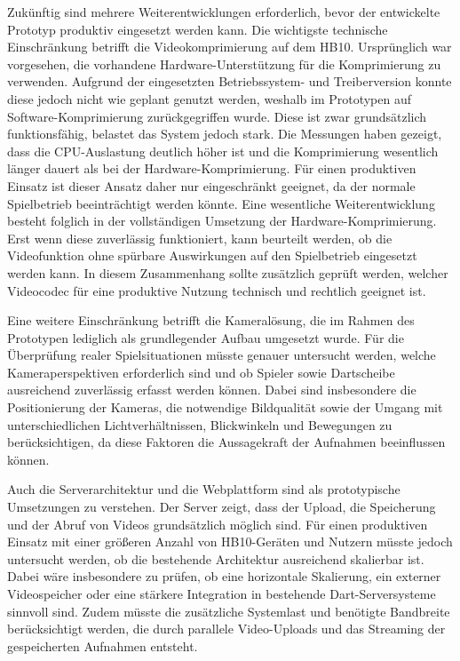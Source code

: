 Zukünftig sind mehrere Weiterentwicklungen erforderlich, bevor der entwickelte Prototyp produktiv eingesetzt werden kann. Die wichtigste technische Einschränkung betrifft die Videokomprimierung auf dem HB10. Ursprünglich war vorgesehen, die vorhandene Hardware-Unterstützung für die Komprimierung zu verwenden. 
Aufgrund der eingesetzten Betriebssystem- und Treiberversion konnte diese jedoch nicht wie geplant genutzt werden, weshalb im Prototypen auf Software-Komprimierung zurückgegriffen wurde. Diese ist zwar grundsätzlich funktionsfähig, belastet das System jedoch stark. Die Messungen haben gezeigt, 
dass die CPU-Auslastung deutlich höher ist und die Komprimierung wesentlich länger dauert als bei der Hardware-Komprimierung. Für einen produktiven Einsatz ist dieser Ansatz daher nur eingeschränkt geeignet, da der normale Spielbetrieb beeinträchtigt werden könnte. 
Eine wesentliche Weiterentwicklung besteht folglich in der vollständigen Umsetzung der Hardware-Komprimierung. Erst wenn diese zuverlässig funktioniert, kann beurteilt werden, ob die Videofunktion ohne spürbare Auswirkungen auf den Spielbetrieb eingesetzt werden kann. 
In diesem Zusammenhang sollte zusätzlich geprüft werden, welcher Videocodec für eine produktive Nutzung technisch und rechtlich geeignet ist. 

Eine weitere Einschränkung betrifft die Kameralösung, die im Rahmen des Prototypen lediglich als grundlegender Aufbau umgesetzt wurde. Für die Überprüfung realer Spielsituationen müsste genauer untersucht werden, 
welche Kameraperspektiven erforderlich sind und ob Spieler sowie Dartscheibe ausreichend zuverlässig erfasst werden können. Dabei sind insbesondere die Positionierung der Kameras, die notwendige Bildqualität sowie der Umgang mit unterschiedlichen Lichtverhältnissen, Blickwinkeln und Bewegungen zu berücksichtigen, 
da diese Faktoren die Aussagekraft der Aufnahmen beeinflussen können. 

Auch die Serverarchitektur und die Webplattform sind als prototypische Umsetzungen zu verstehen. Der Server zeigt, dass der Upload, die Speicherung und der Abruf von Videos grundsätzlich möglich sind. Für einen produktiven Einsatz mit einer größeren Anzahl von HB10-Geräten und Nutzern müsste jedoch untersucht werden, 
ob die bestehende Architektur ausreichend skalierbar ist. Dabei wäre insbesondere zu prüfen, ob eine horizontale Skalierung, ein externer Videospeicher oder eine stärkere Integration in bestehende Dart-Serversysteme sinnvoll sind. Zudem müsste die zusätzliche Systemlast und benötigte Bandbreite berücksichtigt werden, 
die durch parallele Video-Uploads und das Streaming der gespeicherten Aufnahmen entsteht. 

